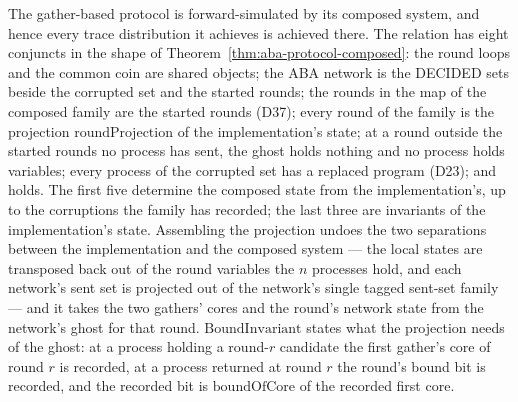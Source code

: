 \begin{theorem}
  \label{thm:aba-afw-protocol-composed}
  \leanok
  The gather-based protocol is forward-simulated by its composed system, and hence every trace distribution it achieves is achieved there.
  The relation has eight conjuncts in the shape of Theorem~\ref{thm:aba-protocol-composed}: the round loops and the common coin are shared objects; the ABA network is the DECIDED sets beside the corrupted set and the started rounds; the rounds in the map of the composed family are the started rounds (D37); every round of the family is the projection $\mathrm{roundProjection}$ of the implementation's state; at a round outside the started rounds no process has sent, the ghost holds nothing and no process holds variables; every process of the corrupted set has a replaced program (D23); and  holds.
  The first five determine the composed state from the implementation's, up to the corruptions the family has recorded; the last three are invariants of the implementation's state.
  Assembling the projection undoes the two separations between the implementation and the composed system --- the local states are transposed back out of the round variables the $n$ processes hold, and each network's sent set is projected out of the network's single tagged sent-set family --- and it takes the two gathers' cores and the round's network state from the network's ghost for that round.
  $\mathrm{BoundInvariant}$ states what the projection needs of the ghost: at a process holding a round-$r$ candidate the first gather's core of round $r$ is recorded, at a process returned at round $r$ the round's bound bit is recorded, and the recorded bit is $\mathrm{boundOfCore}$ of the recorded first core.
\end{theorem}

